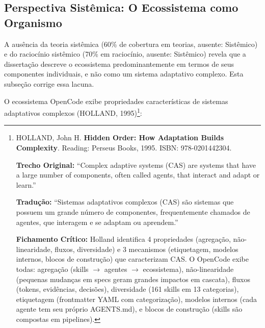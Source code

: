 \subsection{Perspectiva Sistêmica: O Ecossistema como Organismo}

A ausência da teoria sistêmica (60\% de cobertura em teorias, ausente: Sistêmico) e do raciocínio sistêmico (70\% em raciocínio, ausente: Sistêmico) revela que a dissertação descreve o ecossistema predominantemente em termos de seus componentes individuais, e não como um sistema adaptativo complexo. Esta subseção corrige essa lacuna.

O ecossistema OpenCode exibe propriedades características de sistemas adaptativos complexos (HOLLAND, 1995)\footnote{
  HOLLAND, John H. \textbf{Hidden Order: How Adaptation Builds Complexity}. Reading: Perseus Books, 1995. ISBN: 978-0201442304.

  \textbf{Trecho Original:} ``Complex adaptive systems (CAS) are systems that have a large number of components, often called agents, that interact and adapt or learn.''

  \textbf{Tradução:} ``Sistemas adaptativos complexos (CAS) são sistemas que possuem um grande número de componentes, frequentemente chamados de agentes, que interagem e se adaptam ou aprendem.''

  \textbf{Fichamento Crítico:} Holland identifica 4 propriedades (agregação, não-linearidade, fluxos, diversidade) e 3 mecanismos (etiquetagem, modelos internos, blocos de construção) que caracterizam CAS. O OpenCode exibe todas: agregação (skills $\rightarrow$ agentes $\rightarrow$ ecossistema), não-linearidade (pequenas mudanças em specs geram grandes impactos em cascata), fluxos (tokens, evidências, decisões), diversidade (161 skills em 13 categorias), etiquetagem (frontmatter YAML com categorização), modelos internos (cada agente tem seu próprio AGENTS.md), e blocos de construção (skills são compostas em pipelines).
}:

